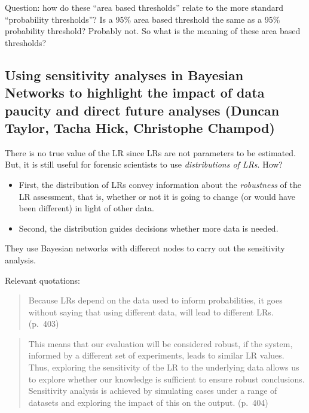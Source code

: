 \documentclass[
  10pt,
  dvipsnames,enabledeprecatedfontcommands]{scrartcl}
\begin{document}
Question: how do these ``area based thresholds'' relate to the more
standard ``probability thresholds''? Is a 95\% area based threshold the
same as a 95\% probability threshold? Probably not. So what is the
meaning of these area based thresholds?

\hypertarget{using-sensitivity-analyses-in-bayesian-networks-to-highlight-the-impact-of-data-paucity-and-direct-future-analyses-duncan-taylor-tacha-hick-christophe-champod}{%
\subsection{Using sensitivity analyses in Bayesian Networks to highlight
the impact of data paucity and direct future analyses (Duncan Taylor,
Tacha Hick, Christophe
Champod)}\label{using-sensitivity-analyses-in-bayesian-networks-to-highlight-the-impact-of-data-paucity-and-direct-future-analyses-duncan-taylor-tacha-hick-christophe-champod}}

There is no true value of the LR since LRs are not parameters to be
estimated. But, it is still useful for forensic scientists to use
\emph{distributions of LRs}. How?

\begin{itemize}
\item
  First, the distribution of LRs convey information about the
  \emph{robustness} of the LR assessment, that is, whether or not it is
  going to change (or would have been different) in light of other data.
\item
  Second, the distribution guides decisions whether more data is needed.
\end{itemize}

They use Bayesian networks with different nodes to carry out the
sensitivity analysis.

\noindent Relevant quotations:

\begin{quote}
Because LRs depend on the data used to inform probabilities, it goes
without saying that using different data, will lead to different LRs.
(p.~403)
\end{quote}

\begin{quote}
This means that our evaluation will be considered robust, if the system,
informed by a different set of experiments, leads to similar LR values.
Thus, exploring the sensitivity of the LR to the underlying data allows
us to explore whether our knowledge is sufficient to ensure robust
conclusions. Sensitivity analysis is achieved by simulating cases under
a range of datasets and exploring the impact of this on the output.
(p.~404)
\end{quote}
\end{document}

